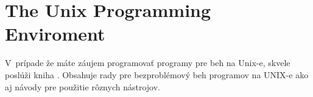 \documentclass[a4paper, 11pt]{article}
\begin{document}
	\section*{The Unix Programming Enviroment}
	
	V~prípade že máte záujem programovať programy pre beh na Unix-e, skvele poslúži kniha \cite{unixprog}. Obsahuje rady pre bezproblémový beh programov na UNIX-e ako aj návody pre použitie rôznych nástrojov.
	
	\nocite{Unix}
	\nocite{wiki}
	\nocite{linuxvoice}
	\nocite{art1}
	\nocite{art2}
	\nocite{web2}
	\nocite{web3}
	
	\newpage
	
	
	
	
\end{document}
